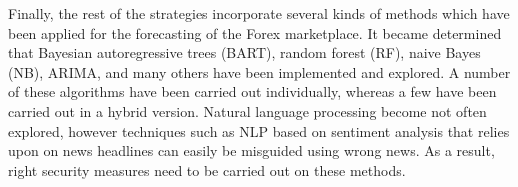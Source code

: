 Finally, the rest of the strategies incorporate several kinds of methods which have been applied for the forecasting of the Forex marketplace. It became determined that Bayesian autoregressive trees (BART), random forest (RF), naive Bayes (NB), ARIMA, and many others have been implemented and explored. A number of these algorithms have been carried out individually, whereas a few have been carried out in a hybrid version. Natural language processing become not often explored, however techniques such as NLP based on sentiment analysis that relies upon on news headlines \cite{Seifollahi} can easily be misguided using wrong news. As a result, right security measures need to be carried out on these methods.

